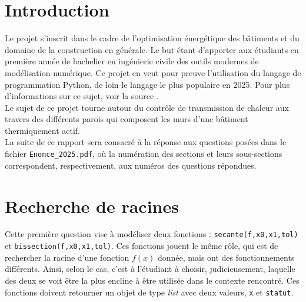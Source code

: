 \documentclass[12pt]{article}
\begin{document}
\sloppy %




\renewcommand{\contentsname}{Table des matières}
\renewcommand{\listfigurename}{Table des figures}
\renewcommand{\listtablename}{Liste des tableaux}

\tableofcontents
\listoffigures
\listoftables
\newpage


\renewcommand\thesection{0} %
\section{Introduction}

    Le projet s'inscrit dans le cadre de l'optimisation énergétique des bâtiments et du domaine de la construction en générale. Le but étant d'apporter aux étudiants en première année de bachelier en ingénierie civile des outils modernes de modélisation numérique. Ce projet en veut pour preuve l'utilisation du langage de programmation Python, de loin le langage le plus populaire en 2025. Pour plus d'informations sur ce sujet, voir la source \cite{Tiobe2025}. \\
    Le sujet de ce projet tourne autour du contrôle de transmission de chaleur aux travers des différents parois qui composent les murs d'une bâtiment thermiquement actif. \\
    La suite de ce rapport sera consacré à la réponse aux questions posées dans le fichier \texttt{Enonce\_2025.pdf}, où la numération des sections et leurs sous-sections correspondent, respectivement, aux numéros des questions répondues.
    
    \renewcommand\thesection{\arabic{section}} %
    \setcounter{section}{0} %

\section{Recherche de racines}

    Cette première question vise à modéliser deux fonctions : \texttt{secante(f,x0,x1,tol)} et \texttt{bissection(f,x0,x1,tol)}. Ces fonctions jouent le même rôle, qui est de rechercher la racine d'une fonction $f(x)$ donnée, mais ont des fonctionnements différents. Ainsi, selon le cas, c'est à l'étudiant à choisir, judicieusement, laquelle des deux se voit être la plus encline à être utilisée dans le contexte rencontré. Ces fonctions doivent retourner un objet de type \textit{list} avec deux valeurs, \texttt{x} et \texttt{statut}.
    
\end{document}
